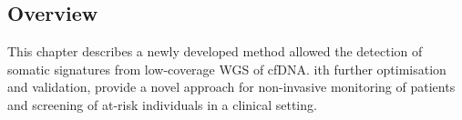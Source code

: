 \subsection{Overview}
This chapter describes a newly developed method allowed the detection of somatic signatures from low-coverage WGS of cfDNA. ith further optimisation and validation,  provide a novel approach for non-invasive monitoring of patients and  screening of at-risk individuals in a clinical setting.
